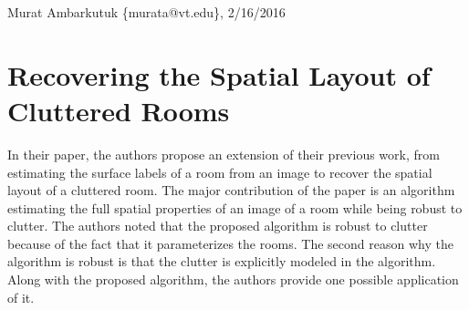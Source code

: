 \documentclass[11pt]{article}
\begin{document}
\thispagestyle{empty}
\begin{flushright}
	\small{Murat Ambarkutuk \{murata@vt.edu\}, 2/16/2016}
\end{flushright}
\section{Recovering the Spatial Layout of Cluttered Rooms}
In their paper, the authors propose an extension of their previous work, from estimating the surface labels of a room from an image to recover the spatial layout of a cluttered room.
The major contribution of the paper is an algorithm estimating the full spatial properties of an image of a room while being robust to clutter.
The authors noted that the proposed algorithm is robust to clutter because of the fact that it parameterizes the rooms.
The second reason why the algorithm is robust is that the clutter is explicitly modeled in the algorithm.
Along with the proposed algorithm, the authors provide one possible application of it.
\end{document}
